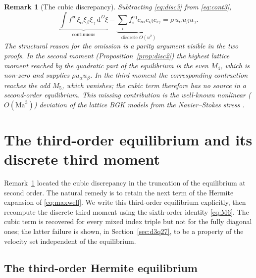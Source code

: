 \documentclass[preprint,11pt]{elsarticle}
\newtheorem{remark}{Remark}
\newcommand{\eq}{\mathrm{eq}}
\newcommand{\dd}{\,\mathrm{d}}
\begin{document}
\begin{remark}[The cubic discrepancy]
\label{rem:cubic}
Subtracting \eqref{eq:disc3} from \eqref{eq:cont3},
\begin{equation}
\underbrace{\int f^{\eq}\xi_\alpha\xi_\beta\xi_\gamma\dd^{D}\xi}_{\text{continuous}}
-\underbrace{\sum_i f_i^{\eq}c_{i\alpha}c_{i\beta}c_{i\gamma}}_{\text{discrete }O(u^{2})}
=\rho\,u_\alpha u_\beta u_\gamma .
\label{eq:gap}
\end{equation}
The structural reason for the omission is a parity argument visible in the
two proofs. In the second moment (Proposition~\ref{prop:disc2}) the highest
lattice moment reached by the quadratic part of the equilibrium is the
\emph{even} $M_4$, which is non-zero and supplies $\rho u_\alpha u_\beta$. In
the third moment the corresponding contraction reaches the \emph{odd} $M_5$,
which vanishes; the cubic term therefore has no source in a second-order
equilibrium. This missing contribution is the well-known nonlinear
($O(\mathrm{Ma}^{3})$) deviation of the lattice BGK models from the
Navier--Stokes stress \citep{QianOrszag1993,Kruger2017}.
\end{remark}

\section{The third-order equilibrium and its discrete third moment}
\label{sec:third-order-eq}

Remark~\ref{rem:cubic} located the cubic discrepancy in the truncation of the
equilibrium at second order. The natural remedy is to retain the next term of
the Hermite expansion of \eqref{eq:maxwell}. We write this third-order
equilibrium explicitly, then recompute the discrete third moment using the
sixth-order identity \eqref{eq:M6}. The cubic term is recovered for every mixed
index triple but not for the fully diagonal ones; the latter failure is shown,
in Section~\ref{sec:d3q27}, to be a property of the velocity set independent of
the equilibrium.

\subsection{The third-order Hermite equilibrium}
\label{sec:feq3}
\end{document}
